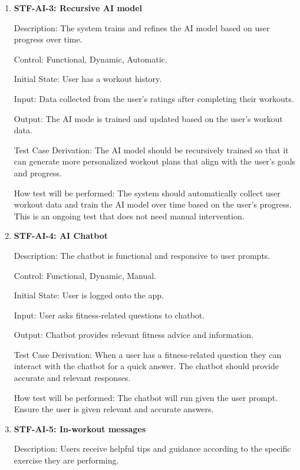 \documentclass[12pt, titlepage]{article}
\begin{document}
\begin{enumerate}
        \item{\textbf{STF-AI-3: Recursive AI model}\\}

        Description: The system trains and refines the AI model based on user progress over time.

        Control: Functional, Dynamic, Automatic.

        Initial State: User has a workout history.

        Input: Data collected from the user’s ratings after completing their workouts.

        Output: The AI mode is trained and updated based on the user’s workout data.

        Test Case Derivation: The AI model should be recursively trained so that it can generate more personalized workout plans that align with the user’s goals and progress.

        How test will be performed: The system should automatically collect user workout data and train the AI model over time based on the user’s progress. This is an ongoing test that does not need manual intervention.

        \item{\textbf{STF-AI-4: AI Chatbot}\\}

        Description: The chatbot is functional and responsive to user prompts.

        Control: Functional, Dynamic, Manual.

        Initial State: User is logged onto the app.

        Input: User asks fitness-related questions to chatbot.

        Output: Chatbot provides relevant fitness advice and information.

        Test Case Derivation: When a user has a fitness-related question they can interact with the chatbot for a quick answer. The chatbot should provide accurate and relevant responses.

        How test will be performed: The chatbot will run given the user prompt. Ensure the user is given relevant and accurate answers.

        \item{\textbf{STF-AI-5: In-workout messages}\\}

        Description: Users receive helpful tips and guidance according to the specific exercise they are performing.


\end{enumerate}
\end{document}
